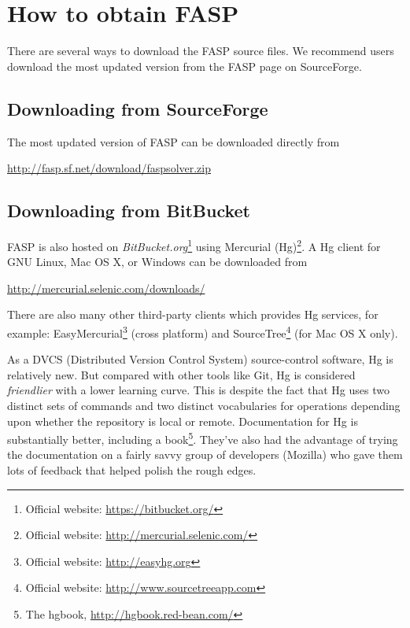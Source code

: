 \documentclass[11pt]{memoir}
\begin{document}
\section{How to obtain FASP}\label{sec:install}

There are several ways to download the FASP source files. We recommend users download the most updated version from the FASP page on SourceForge. 

\subsection{Downloading from SourceForge}

The most updated version of FASP can be downloaded directly from
%
\begin{center}
\url{http://fasp.sf.net/download/faspsolver.zip}
\end{center}
%

\subsection{Downloading from BitBucket}

FASP is also hosted on
\emph{BitBucket.org}\footnote{Official website:
  \url{https://bitbucket.org/}} using Mercurial (Hg)\footnote{Official
  website: \url{http://mercurial.selenic.com/}}. A Hg client for GNU
Linux, Mac OS X, or Windows can be downloaded from
\begin{center}
  \url{http://mercurial.selenic.com/downloads/}
\end{center}
%
There are also many other third-party clients which provides Hg services, for example: EasyMercurial\footnote{Official website: \url{http://easyhg.org}} (cross platform) and SourceTree\footnote{Official website: \url{http://www.sourcetreeapp.com}} (for Mac OS X only).

As a DVCS (Distributed Version Control System) source-control
software, Hg is relatively new. But compared with other tools like
Git, Hg is considered \emph{friendlier} with a lower learning
curve. This is despite the fact that Hg uses two distinct sets of
commands and two distinct vocabularies for operations depending upon
whether the repository is local or remote.  Documentation for Hg is
substantially better, including a book\footnote{The hgbook,
  \url{http://hgbook.red-bean.com/}}. They've also had the advantage
of trying the documentation on a fairly savvy group of developers
(Mozilla) who gave them lots of feedback that helped polish the rough
edges.
\end{document}
